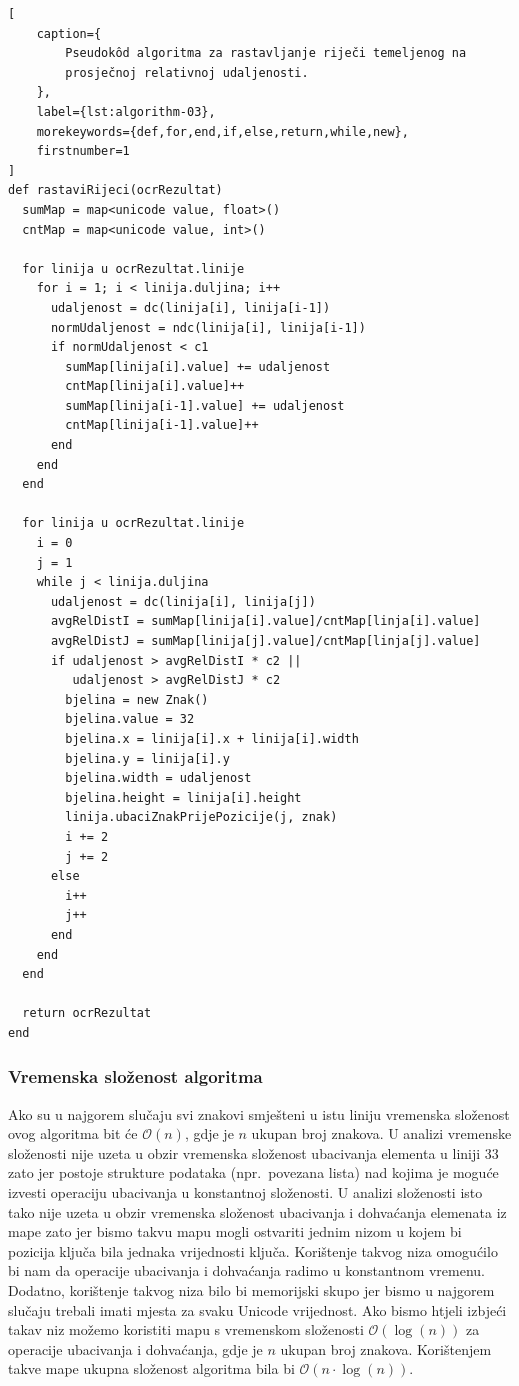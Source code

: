\documentclass[times, utf8, zavrsni]{fer}
\begin{document}
\begin{lstlisting}[
    caption={
        Pseudokôd algoritma za rastavljanje riječi temeljenog na
        prosječnoj relativnoj udaljenosti.
    },
    label={lst:algorithm-03},
    morekeywords={def,for,end,if,else,return,while,new},
    firstnumber=1
]
def rastaviRijeci(ocrRezultat)
  sumMap = map<unicode value, float>()
  cntMap = map<unicode value, int>()

  for linija u ocrRezultat.linije
    for i = 1; i < linija.duljina; i++
      udaljenost = dc(linija[i], linija[i-1])
      normUdaljenost = ndc(linija[i], linija[i-1])
      if normUdaljenost < c1
        sumMap[linija[i].value] += udaljenost
        cntMap[linija[i].value]++
        sumMap[linija[i-1].value] += udaljenost
        cntMap[linija[i-1].value]++
      end
    end
  end

  for linija u ocrRezultat.linije
    i = 0
    j = 1
    while j < linija.duljina
      udaljenost = dc(linija[i], linija[j])
      avgRelDistI = sumMap[linija[i].value]/cntMap[linja[i].value]
      avgRelDistJ = sumMap[linija[j].value]/cntMap[linja[j].value]
      if udaljenost > avgRelDistI * c2 ||
         udaljenost > avgRelDistJ * c2
        bjelina = new Znak()
        bjelina.value = 32
        bjelina.x = linija[i].x + linija[i].width
        bjelina.y = linija[i].y
        bjelina.width = udaljenost
        bjelina.height = linija[i].height
        linija.ubaciZnakPrijePozicije(j, znak)
        i += 2
        j += 2
      else
        i++
        j++
      end
    end
  end

  return ocrRezultat
end
\end{lstlisting}


\subsubsection{Vremenska složenost algoritma}
Ako su u najgorem slučaju svi znakovi smješteni u istu liniju vremenska
složenost ovog algoritma bit će $\mathcal{O}(n)$, gdje je $n$ ukupan broj
znakova. U analizi vremenske složenosti nije uzeta u obzir vremenska složenost
ubacivanja elementa u liniji $33$ zato jer postoje strukture podataka
(npr.\ povezana lista) nad kojima je moguće izvesti operaciju ubacivanja u
konstantnoj složenosti. U analizi složenosti isto tako nije uzeta u obzir
vremenska složenost ubacivanja i dohvaćanja elemenata iz mape zato jer bismo
takvu mapu mogli ostvariti jednim nizom u kojem bi pozicija ključa bila jednaka
vrijednosti ključa. Korištenje takvog niza omogućilo bi nam da operacije
ubacivanja i dohvaćanja radimo u konstantnom vremenu. Dodatno, korištenje
takvog niza bilo bi memorijski skupo jer bismo u najgorem slučaju trebali imati
mjesta za svaku Unicode vrijednost. Ako bismo htjeli izbjeći takav niz možemo
koristiti mapu s vremenskom složenosti $\mathcal{O}(\log(n))$ za operacije
ubacivanja i dohvaćanja, gdje je $n$ ukupan broj znakova. Korištenjem takve
mape ukupna složenost algoritma bila bi $\mathcal{O}(n \cdot \log(n))$.
\end{document}
